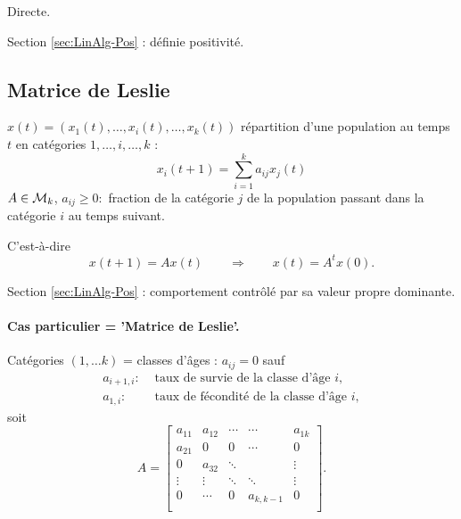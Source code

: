 \proof Directe. \eproof

\remark Section \ref{sec:LinAlg-Pos} : définie positivité.

\subsection{Matrice de Leslie}  \label{sec:MatLeslie}

$x(t) = (x_1(t), \dots, x_i(t), \dots, x_k(t))$ répartition d'une population au temps $t$ en catégories $1, \dots, i, \dots, k$ :
$$
x_i(t+1) = \sum_{i=1}^k a_{ij} x_j(t) 
$$
$A \in \mathcal{M}_k$, $a_{ij} \geq 0 : $ fraction de la catégorie $j$ de la population passant dans la catégorie $i$ au temps suivant. 

C'est-à-dire
$$
x(t+1) = A x(t) 
\qquad \Rightarrow \qquad 
x(t) = A^t x(0).
$$

\remark Section \ref{sec:LinAlg-Pos} : comportement contrôlé par sa valeur propre dominante.

\paragraph*{Cas particulier = 'Matrice de Leslie'.}

Catégories $(1, \dots k)$ = classes d'âges : $a_{ij} = 0$ sauf 
\begin{align*}
  a_{i+1, i} : & \text{ taux de survie de la classe d'âge $i$}, \\
  a_{1, i} : & \text{ taux de fécondité de la classe d'âge $i$}, 
\end{align*}
soit 
$$
A = \left[\begin{array}{cccccc}
            a_{11} & a_{12} & \cdots  & \cdots & a_{1k} \\
            a_{21} & 0 & 0  & \cdots & 0 \\
            0 & a_{32} & \ddots & & \vdots \\
            \vdots & \vdots & \ddots & \ddots & \vdots \\
            0 & \cdots & 0 & a_{k, k-1} & 0 \\
          \end{array}\right].
$$

